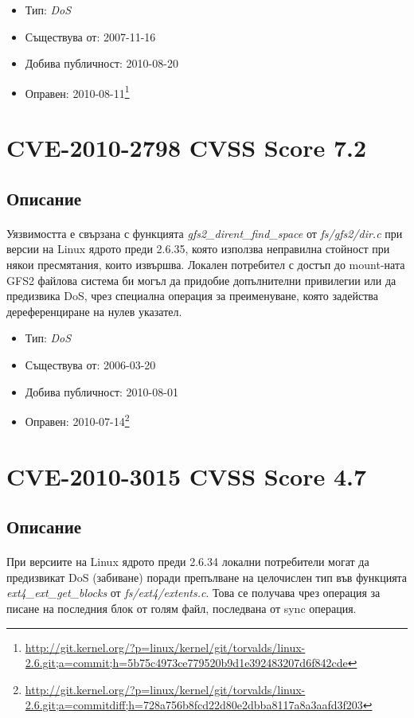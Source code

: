\documentclass[a4paper,12pt,leqno]{article}
\begin{document}
\begin{itemize}
    \item Тип: \textit{DoS}
    \item Съществува от: 2007-11-16
  	\item Добива публичност: 2010-08-20
    \item Оправен: 2010-08-11\footnote{\url{http://git.kernel.org/?p=linux/kernel/git/torvalds/linux-2.6.git;a=commit;h=5b75c4973ce779520b9d1e392483207d6f842cde}}
\end{itemize}

\section{CVE-2010-2798 CVSS Score 7.2}
\subsection{Описание}
\paragraph{}
Уязвимостта е свързана с функцията \textit{gfs2\_dirent\_find\_space} от \textit{fs/gfs2/dir.c} при 
версии на Linux ядрото преди 2.6.35, която използва неправилна стойност при 
някои пресмятания, които извършва. Локален потребител с достъп до mount-ната GFS2 файлова система би могъл да придобие допълнителни привилегии 
или да предизвика DoS, чрез специална операция за преименуване, която 
задейства дереференциране на нулев указател.

\begin{itemize}
    \item Тип: \textit{DoS}
    \item Съществува от: 2006-03-20
  	\item Добива публичност: 2010-08-01
    \item Оправен: 2010-07-14\footnote{\url{http://git.kernel.org/?p=linux/kernel/git/torvalds/linux-2.6.git;a=commitdiff;h=728a756b8fcd22d80e2dbba8117a8a3aafd3f203}}
\end{itemize}

\section{CVE-2010-3015 CVSS Score 4.7}
\subsection{Описание}
\paragraph{}
При версиите на Linux ядрото преди 2.6.34 локални потребители могат да 
предизвикат DoS (забиване) поради препълване на целочислен тип във 
функцията \textit{ext4\_ext\_get\_blocks} от \textit{fs/ext4/extents.c}. Това се получава чрез 
операция за писане на последния блок от голям файл, последвана от sync 
операция.
\end{document}
